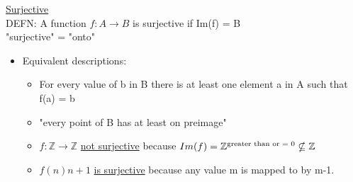 \documentclass{article}
\begin{document}
\underline{Surjective}\\

DEFN: A function $f: A \rightarrow B$ is surjective if Im(f) = B\\

"surjective" = "onto"\\

\begin{itemize}
\item Equivalent descriptions:
\begin{itemize}
\item For every value of b in B there is at least one element a in A such that f(a) = b
\item "every point of B has at least on preimage"
\item $f: \mathbb{Z} \rightarrow \mathbb{Z}$ \underline{not surjective} because $Im(f) = \mathbb{Z\textsuperscript{greater than or = 0} \nsubseteq \mathbb{Z}}$
\item $f(n) n+1$ \underline{is surjective} because any value m is mapped to by m-1.
\end{itemize}
\end{itemize}










\end{document}
